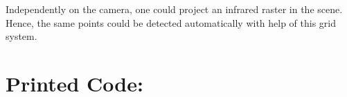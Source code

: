 \documentclass[a4paper,headings=small]{scrartcl}
\numberwithin{equation}{section} %
\numberwithin{figure}{section}   %
\begin{document}
Independently on the camera, one could project an infrared raster in the scene.
Hence, the same points could be detected automatically with help of this grid system.

\section{Printed Code:}


\end{document}
